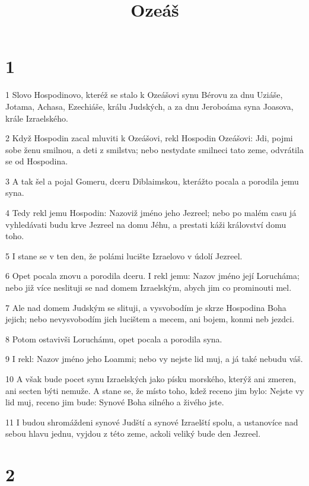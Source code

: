 

\title{Ozeáš}

\chapter{1}

\par 1 Slovo Hospodinovo, kteréž se stalo k Ozeášovi synu Bérovu za dnu Uziáše, Jotama, Achasa, Ezechiáše, králu Judských, a za dnu Jeroboáma syna Joasova, krále Izraelského.
\par 2 Když Hospodin zacal mluviti k Ozeášovi, rekl Hospodin Ozeášovi: Jdi, pojmi sobe ženu smilnou, a deti z smilstva; nebo nestydate smilneci tato zeme, odvrátila se od Hospodina.
\par 3 A tak šel a pojal Gomeru, dceru Diblaimskou, kterážto pocala a porodila jemu syna.
\par 4 Tedy rekl jemu Hospodin: Nazoviž jméno jeho Jezreel; nebo po malém casu já vyhledávati budu krve Jezreel na domu Jéhu, a prestati káži království domu toho.
\par 5 I stane se v ten den, že polámi lucište Izraelovo v údolí Jezreel.
\par 6 Opet pocala znovu a porodila dceru. I rekl jemu: Nazov jméno její Lorucháma; nebo již více neslituji se nad domem Izraelským, abych jim co prominouti mel.
\par 7 Ale nad domem Judským se slituji, a vysvobodím je skrze Hospodina Boha jejich; nebo nevysvobodím jich lucištem a mecem, ani bojem, konmi neb jezdci.
\par 8 Potom ostavivši Loruchámu, opet pocala a porodila syna.
\par 9 I rekl: Nazov jméno jeho Loammi; nebo vy nejste lid muj, a já také nebudu váš.
\par 10 A však bude pocet synu Izraelských jako písku morského, kterýž ani zmeren, ani secten býti nemuže. A stane se, že místo toho, kdež receno jim bylo: Nejste vy lid muj, receno jim bude: Synové Boha silného a živého jste.
\par 11 I budou shromáždeni synové Judští a synové Izraelští spolu, a ustanovíce nad sebou hlavu jednu, vyjdou z této zeme, ackoli veliký bude den Jezreel.

\chapter{2}

